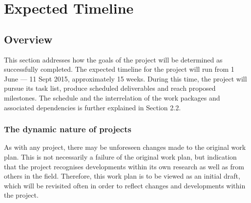 \documentclass[a4paper]{article}
\begin{document}



\pagebreak

\section{Expected Timeline}

\subsection{Overview}

This section addresses how the goals of the project will be determined as successfully completed.
The expected timeline for the project will run from 1 June --- 11 Sept 2015, approximately 15 weeks.
During this time, the project will pursue its task list, produce scheduled deliverables and reach
proposed milestones. The schedule and the interrelation of the work packages and associated
dependencies is further explained in Section 2.2.

\subsubsection{The dynamic nature of projects}

As with any project, there may be unforeseen changes made to the original work plan. This is not
necessarily a failure of the original work plan, but indication that the project recognises
developments within its own research as well as from others in the field. Therefore, this work plan
is to be viewed as an initial draft, which will be revisited often in order to reflect changes and
developments within the project.
\end{document}
